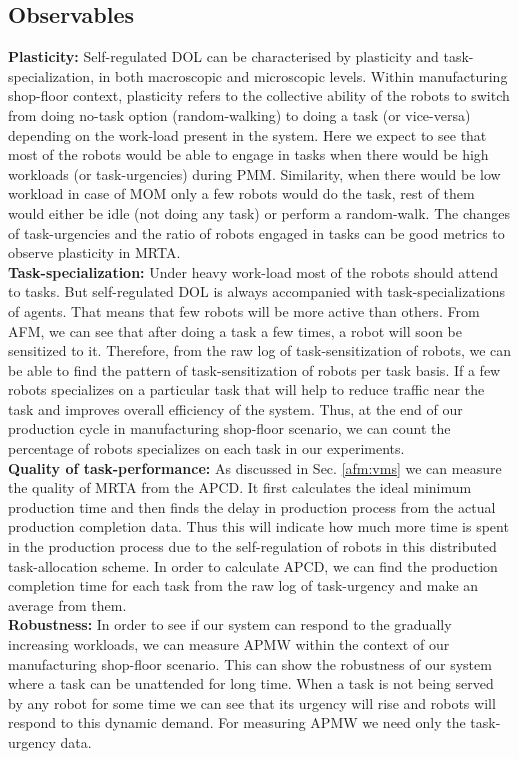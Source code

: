 \documentclass[final,5p,times,twocolumn]{elsarticle}
\begin{document}
\subsection{Observables}
\textbf{Plasticity:} %
Self-regulated DOL can be characterised by plasticity and task-specialization, in both macroscopic and microscopic levels. Within manufacturing shop-floor context, plasticity refers to the collective ability of the robots to switch from doing no-task option (random-walking) to doing a task (or vice-versa) depending on the work-load present in the system. Here we expect to see that most of the robots would be able to engage in tasks when there would be high workloads (or task-urgencies) during PMM. Similarity, when there would be low workload in case of MOM only a few robots would do the task, rest of them would either be idle (not doing any task) or perform a random-walk.  The changes of task-urgencies and the ratio of robots engaged in tasks can be good metrics to observe plasticity in MRTA.\\
\textbf{Task-specialization:} Under heavy work-load most of the robots should attend to tasks. But self-regulated DOL is always accompanied with task-specializations of agents. That means that few robots will be more active than others. From AFM, we can see that after doing a task a few times, a robot will soon be sensitized to it. Therefore, from the raw log of task-sensitization of robots, we can be able to find the pattern of task-sensitization of robots per task basis. If a few robots specializes on a particular task that will help to reduce traffic near the task and improves overall efficiency of the system. Thus, at the end of our production cycle in manufacturing shop-floor scenario, we can count the percentage of robots specializes on each task in our experiments.\\
\textbf{Quality of task-performance:} As discussed in Sec. \ref{afm:vms} we can measure the quality of MRTA from the APCD. It first calculates the ideal minimum production time and then finds the delay in production process from the actual production completion data. Thus this will indicate how much more time is  spent in the production process due to the self-regulation of robots in this distributed task-allocation scheme.  In order to calculate APCD, we can find the production completion time for each task from the raw log of task-urgency and make an average from them.\\
\textbf{Robustness:} In order to see if our system can respond to the gradually increasing workloads,  we can measure APMW within the context of our manufacturing shop-floor scenario. This can show the robustness of our system where a task can be  unattended for long time. When a task is not being served by any robot for some time we can see that its urgency will rise and robots will respond to this dynamic demand. For measuring APMW we need only the task-urgency data.\\
\end{document}
